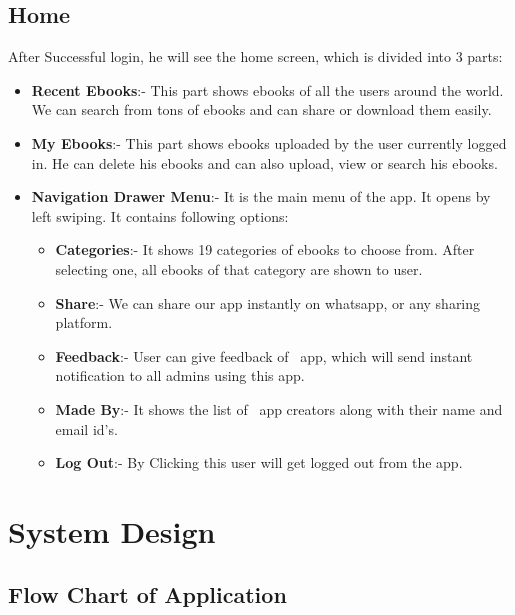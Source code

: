 	\subsection{Home}
	After Successful login, he will see the home screen, which is divided into 3 parts:
	\begin{itemize}
		\item \textbf{Recent Ebooks}:- This part shows ebooks of all the users around the world. We can search from tons of ebooks and can share or download them easily.
		\item \textbf{My Ebooks}:- This part shows ebooks uploaded by the user currently logged in. He can delete his ebooks and can also upload, view or search his ebooks.
		
		\item \textbf{Navigation Drawer Menu}:- It is the main menu of the app. It opens by left swiping. It contains following options:
		\begin{itemize}
			\item \textbf{Categories}:- It shows 19 categories of ebooks to choose from. After selecting one, all ebooks of that category are shown to user.
			
			\item \textbf{Share}:- We can share our app instantly on whatsapp, or any sharing platform.
			
			\item \textbf{Feedback}:- User can give feedback of \appName \ app, which will send instant notification to all admins using this app.
			
			\item \textbf{Made By}:-  It shows the list of \appName \ app creators along with their name and email id's.
			
			\item \textbf{Log Out}:- By Clicking this user will get logged out from the app.
		\end{itemize}
	\end{itemize}

\section{System Design}
\subsection{Flow Chart of Application}

